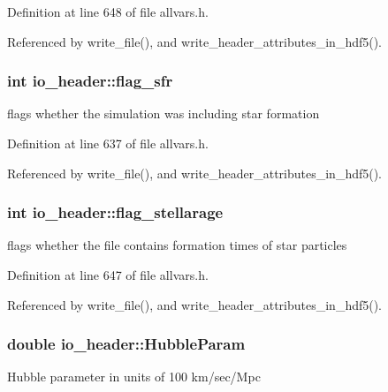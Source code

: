 Definition at line 648 of file allvars.h.



Referenced by write\_\-file(), and write\_\-header\_\-attributes\_\-in\_\-hdf5().

\hypertarget{structio__header_afe21a629578012fd99d118d2ad834763}{
\subsubsection[{flag\_\-sfr}]{\setlength{\rightskip}{0pt plus 5cm}int {\bf io\_\-header::flag\_\-sfr}}}
\label{structio__header_afe21a629578012fd99d118d2ad834763}
flags whether the simulation was including star formation 

Definition at line 637 of file allvars.h.



Referenced by write\_\-file(), and write\_\-header\_\-attributes\_\-in\_\-hdf5().

\hypertarget{structio__header_abe83e840bb4778a3be11a084dfa85c3c}{
\subsubsection[{flag\_\-stellarage}]{\setlength{\rightskip}{0pt plus 5cm}int {\bf io\_\-header::flag\_\-stellarage}}}
\label{structio__header_abe83e840bb4778a3be11a084dfa85c3c}
flags whether the file contains formation times of star particles 

Definition at line 647 of file allvars.h.



Referenced by write\_\-file(), and write\_\-header\_\-attributes\_\-in\_\-hdf5().

\hypertarget{structio__header_ad0f0d02804350f8935aadca9b5ef0fcf}{
\subsubsection[{HubbleParam}]{\setlength{\rightskip}{0pt plus 5cm}double {\bf io\_\-header::HubbleParam}}}
\label{structio__header_ad0f0d02804350f8935aadca9b5ef0fcf}
Hubble parameter in units of 100 km/sec/Mpc 


